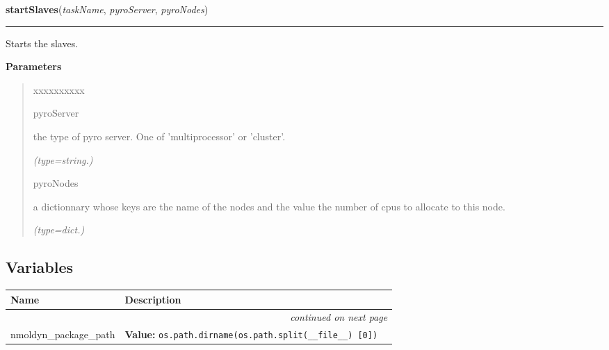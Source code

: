 \hspace{.8\funcindent}\begin{boxedminipage}{\funcwidth}

    \raggedright \textbf{startSlaves}(\textit{taskName}, \textit{pyroServer}, \textit{pyroNodes})

    \vspace{-1.5ex}

    \rule{\textwidth}{0.5\fboxrule}
\setlength{\parskip}{2ex}
    Starts the slaves.

\setlength{\parskip}{1ex}
      \textbf{Parameters}
      \vspace{-1ex}

      \begin{quote}
        \begin{Ventry}{xxxxxxxxxx}

          \item[pyroServer]

          the type of pyro server. One of 'multiprocessor' or 'cluster'.

            {\it (type=string.)}

          \item[pyroNodes]

          a dictionnary whose keys are the name of the nodes and the value 
          the number of cpus to allocate to this node.

            {\it (type=dict.)}

        \end{Ventry}

      \end{quote}

    \end{boxedminipage}



  \subsection{Variables}

    \vspace{-1cm}
\hspace{\varindent}\begin{longtable}{|p{\varnamewidth}|p{\vardescrwidth}|l}
\cline{1-2}
\cline{1-2} \centering \textbf{Name} & \centering \textbf{Description}& \\
\cline{1-2}
\endhead\cline{1-2}\multicolumn{3}{r}{\small\textit{continued on next page}}\\\endfoot\cline{1-2}
\endlastfoot\raggedright n\-m\-o\-l\-d\-y\-n\-\_\-p\-a\-c\-k\-a\-g\-e\-\_\-p\-a\-t\-h\- & \raggedright \textbf{Value:} 
{\tt os.path.dirname(os.path.split(\_\_file\_\_) [0])}&\\
\cline{1-2}
\end{longtable}


